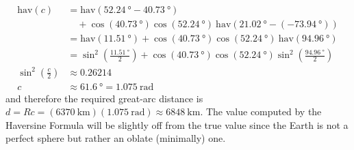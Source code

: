 \begin{solution}
\begin{align*}
\text{hav}(c) &= \text{hav}(\SI{52.24}{\degree} - \SI{40.73}{\degree}) \\
&\quad+ \cos (\SI{40.73}{\degree}) \cos (\SI{52.24}{\degree})\ \text{hav}(\SI{21.02}{\degree} - (\SI{-73.94}{\degree})) \\
&= \text{hav}(\SI{11.51}{\degree}) + \cos (\SI{40.73}{\degree}) \cos (\SI{52.24}{\degree})\ \text{hav}(\SI{94.96}{\degree}) \\
&= \sin^2 \left(\frac{\SI{11.51}{\degree}}{2}\right) + \cos (\SI{40.73}{\degree}) \cos (\SI{52.24}{\degree}) \sin^2 \left(\frac{\SI{94.96}{\degree}}{2}\right) \\
\sin^2 \left(\frac{c}{2}\right) &\approx 0.26214 \\
c &\approx \SI{61.6}{\degree} = \SI{1.075}{\radian}
\end{align*}
and therefore the required great-arc distance is $d = Rc = (\SI{6370}{\km})(\SI{1.075}{\radian}) \approx \SI{6848}{\km}$. The value computed by the Haversine Formula will be slightly off from the true value since the Earth is not a perfect sphere but rather an oblate (minimally) one.
\end{solution}

